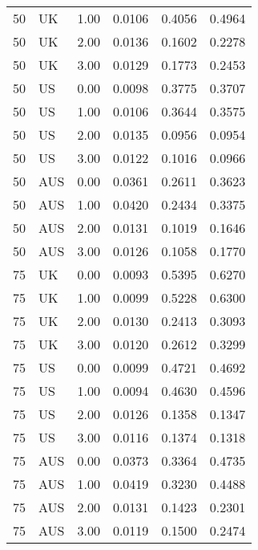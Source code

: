 \begin{table}[ht]
\begin{tabular}{llrlll}
  50 & UK & 1.00 & 0.0106 & 0.4056 & 0.4964 \\ 
  50 & UK & 2.00 & 0.0136 & 0.1602 & 0.2278 \\ 
  50 & UK & 3.00 & 0.0129 & 0.1773 & 0.2453 \\ 
  50 & US & 0.00 & 0.0098 & 0.3775 & 0.3707 \\ 
  50 & US & 1.00 & 0.0106 & 0.3644 & 0.3575 \\ 
  50 & US & 2.00 & 0.0135 & 0.0956 & 0.0954 \\ 
  50 & US & 3.00 & 0.0122 & 0.1016 & 0.0966 \\ 
  50 & AUS & 0.00 & 0.0361 & 0.2611 & 0.3623 \\ 
  50 & AUS & 1.00 & 0.0420 & 0.2434 & 0.3375 \\ 
  50 & AUS & 2.00 & 0.0131 & 0.1019 & 0.1646 \\ 
  50 & AUS & 3.00 & 0.0126 & 0.1058 & 0.1770 \\ 
  75 & UK & 0.00 & 0.0093 & 0.5395 & 0.6270 \\ 
  75 & UK & 1.00 & 0.0099 & 0.5228 & 0.6300 \\ 
  75 & UK & 2.00 & 0.0130 & 0.2413 & 0.3093 \\ 
  75 & UK & 3.00 & 0.0120 & 0.2612 & 0.3299 \\ 
  75 & US & 0.00 & 0.0099 & 0.4721 & 0.4692 \\ 
  75 & US & 1.00 & 0.0094 & 0.4630 & 0.4596 \\ 
  75 & US & 2.00 & 0.0126 & 0.1358 & 0.1347 \\ 
  75 & US & 3.00 & 0.0116 & 0.1374 & 0.1318 \\ 
  75 & AUS & 0.00 & 0.0373 & 0.3364 & 0.4735 \\ 
  75 & AUS & 1.00 & 0.0419 & 0.3230 & 0.4488 \\ 
  75 & AUS & 2.00 & 0.0131 & 0.1423 & 0.2301 \\ 
  75 & AUS & 3.00 & 0.0119 & 0.1500 & 0.2474 \\ 
   \hline
\end{tabular}
\end{table}
